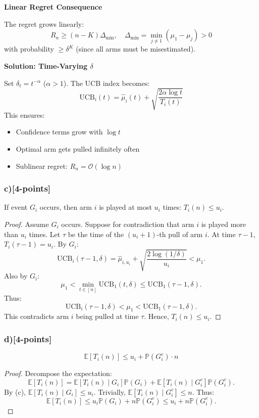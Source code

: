 \documentclass[12pt]{article}
\begin{document}
{{\textbf{Linear Regret Consequence}

The regret grows linearly:
\[
R_n \geq (n - K) \Delta_{\min}, \quad \Delta_{\min} = \min_{j \neq 1} (\mu_1 - \mu_j) > 0
\]
with probability $\geq \delta^{K}$ (since all arms must be misestimated).

\textbf{Solution: Time-Varying $\delta$}

Set $\delta_t = t^{-\alpha}$ ($\alpha > 1$). The UCB index becomes:
\[
\mathrm{UCB}_i(t) = \hat{\mu}_i(t) + \sqrt{\frac{2\alpha \log t}{T_i(t)}}
\]
This ensures:
\begin{itemize}
    \item Confidence terms grow with $\log t$
    \item Optimal arm gets pulled infinitely often
    \item Sublinear regret: $R_n = \mathcal{O}(\log n)$
\end{itemize}

\subsubsection{c)[4-points]}
If event $G_i$ occurs, then arm $i$ is played at most $u_i$ times: $T_i(n) \leq u_i$.

\begin{proof}
Assume $G_i$ occurs. Suppose for contradiction that arm $i$ is played more than $u_i$ times. Let $\tau$ be the time of the $(u_i + 1)$-th pull of arm $i$. At time $\tau-1$, $T_i(\tau-1) = u_i$. By $G_i$:
\[
\mathrm{UCB}_i(\tau-1, \delta) = \hat{\mu}_{i,u_i} + \sqrt{\frac{2\log(1/\delta)}{u_i}} < \mu_1.
\]
Also by $G_i$:
\[
\mu_1 < \min_{t \in [n]} \mathrm{UCB}_1(t, \delta) \leq \mathrm{UCB}_1(\tau-1, \delta).
\]
Thus:
\[
\mathrm{UCB}_i(\tau-1, \delta) < \mu_1 < \mathrm{UCB}_1(\tau-1, \delta).
\]
This contradicts arm $i$ being pulled at time $\tau$. Hence, $T_i(n) \leq u_i$.
\end{proof}

\subsubsection{d)[4-points]}
\[
\mathbb{E}[T_i(n)] \leq u_i + \mathbb{P}(G_i^c) \cdot n
\]

\begin{proof}
Decompose the expectation:
\[
\mathbb{E}[T_i(n)] = \mathbb{E}[T_i(n) \mid G_i] \mathbb{P}(G_i) + \mathbb{E}[T_i(n) \mid G_i^c] \mathbb{P}(G_i^c).
\]
By (c), $\mathbb{E}[T_i(n) \mid G_i] \leq u_i$. Trivially, $\mathbb{E}[T_i(n) \mid G_i^c] \leq n$. Thus:
\[
\mathbb{E}[T_i(n)] \leq u_i \mathbb{P}(G_i) + n \mathbb{P}(G_i^c) \leq u_i + n \mathbb{P}(G_i^c).
\]
\end{proof}

}}
\end{document}
